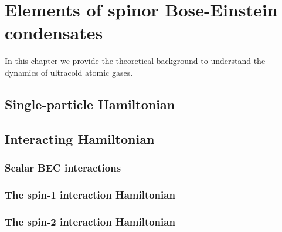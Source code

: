\chapter{Elements of spinor Bose-Einstein condensates}

In this chapter we provide the theoretical background to understand the 
dynamics of ultracold atomic gases.


\section{Single-particle Hamiltonian}

\section{Interacting Hamiltonian}

\subsection{Scalar BEC interactions}

\subsection{The spin-1 interaction Hamiltonian}

\subsection{The spin-2 interaction Hamiltonian}
